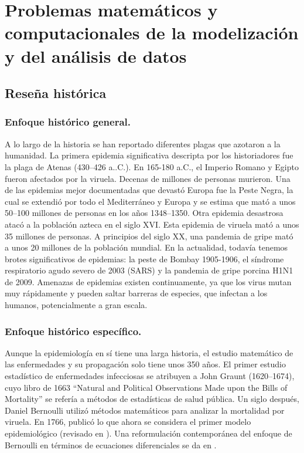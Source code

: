 \documentclass{article}
\begin{document}
 



\section{Problemas matemáticos y computacionales de la modelización y del análisis de datos} \label{proble} 




\subsection{Reseña histórica} \label{rhist} 

\subsubsection*{Enfoque histórico general.}
A lo largo de la historia se han reportado diferentes plagas que azotaron a la humanidad. La primera epidemia significativa descripta por los historiadores fue la plaga de Atenas (430--426 a..C.). En 165-180 a.C., el Imperio Romano y Egipto fueron afectados por la viruela. Decenas de millones de personas murieron. Una de las epidemias mejor documentadas que devastó Europa fue la Peste Negra, la cual se extendió por todo el Mediterráneo y Europa y se estima que mató a unos 50--100 millones de personas en los años 1348--1350. Otra epidemia desastrosa atacó a la población azteca en el siglo XVI. Esta epidemia de viruela mató a unos 35 millones de personas. A principios del siglo XX, una pandemia de gripe mató a unos 20 millones de la población mundial. En la actualidad, todavía tenemos brotes significativos de epidemias: la peste de Bombay 1905-1906, el síndrome respiratorio agudo severo de 2003 (SARS) y la pandemia de gripe porcina H1N1 de 2009. Amenazas de epidemias existen continuamente, ya que los virus mutan muy rápidamente y pueden saltar barreras de especies, que infectan a los humanos, potencialmente a gran escala.

\subsubsection{Enfoque histórico específico.}

Aunque la epidemiología en sí tiene una larga historia, el estudio matemático de las enfermedades y su propagación solo tiene unos 350 años. El primer estudio estadístico de enfermedades infecciosas se atribuyen a John Graunt (1620--1674), cuyo libro de 1663 ``Natural
and Political Observations Made upon the Bills of Mortality'' se refería a métodos de estadísticas de salud pública. Un siglo después, Daniel Bernoulli utilizó métodos matemáticos para analizar la mortalidad por viruela. En 1766, publicó lo que ahora se considera el primer modelo epidemiológico (revisado en \cite{bernoulli2004attempt}). Una reformulación contemporánea del enfoque de Bernoulli en términos de ecuaciones diferenciales se da en \cite{dietz2002daniel}.
\end{document}
